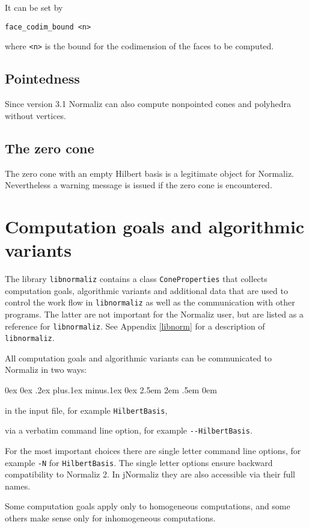 \documentclass[12pt,a4paper]{scrartcl}
\newcounter{listi}
\newcommand{\stdli}{ \topsep0ex \partopsep0ex %
\parsep.2ex plus.1ex minus.1ex \itemsep0ex%
\leftmargin2.5em \labelwidth2em \labelsep.5em \rightmargin0em}%
\newenvironment{arab}{\begin{list}{\textup{(\arabic{listi})}}%
	{\usecounter{listi}\stdli}}{\end{list}}
\theoremstyle{definition}
\begin{document}
It can be set by
\begin{Verbatim}
face_codim_bound <n>
\end{Verbatim}
where \verb|<n>| is the bound for the codimension of the faces to be computed.


\subsection{Pointedness}

Since version 3.1 Normaliz can also compute nonpointed cones and polyhedra without vertices.

\subsection{The zero cone}\label{zero}
The zero cone with an empty Hilbert basis is a legitimate
object for Normaliz. Nevertheless a warning message is issued
if the zero cone is encountered.

\section{Computation goals and algorithmic variants}\label{Goals}

The library \verb|libnormaliz| contains a class \verb|ConeProperties| that collects computation goals, algorithmic variants and additional data that are used to control the work flow in \verb|libnormaliz| as well as the communication with other programs. The latter are not important for the Normaliz user, but are listed as a reference for \verb|libnormaliz|. See Appendix \ref{libnorm} for a description of \verb|libnormaliz|.

All computation goals and algorithmic variants can be communicated to Normaliz in two ways:
\begin{arab}
	\item in the input file, for example \verb|HilbertBasis|,
	\item via a verbatim command line option, for example \verb|--HilbertBasis|.
\end{arab}
For the most important choices there are single letter command line options, for example \verb|-N| for \verb|HilbertBasis|. The single letter options ensure backward compatibility to Normaliz 2. In jNormaliz they are also accessible via their full names.

Some computation goals apply only to homogeneous computations, and some others make sense only for inhomogeneous computations.
\end{document}
